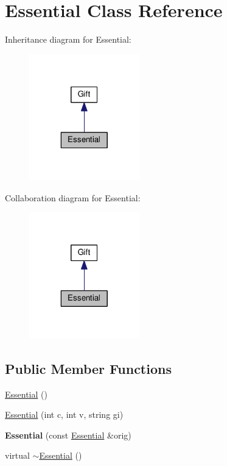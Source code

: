 \hypertarget{class_essential}{\section{Essential Class Reference}
\label{class_essential}
}


Inheritance diagram for Essential\-:
\nopagebreak
\begin{figure}[H]
\begin{center}
\leavevmode
\includegraphics[width=136pt]{class_essential__inherit__graph}
\end{center}
\end{figure}


Collaboration diagram for Essential\-:
\nopagebreak
\begin{figure}[H]
\begin{center}
\leavevmode
\includegraphics[width=136pt]{class_essential__coll__graph}
\end{center}
\end{figure}
\subsection*{Public Member Functions}
\begin{DoxyCompactItemize}
\item 
\hyperlink{class_essential_aaef0174caac5c3e828fe83880cf94a2e}{Essential} ()
\item 
\hyperlink{class_essential_a111a6573313c9f5db1f0399a677aa5d0}{Essential} (int c, int v, string gi)
\item 
\hypertarget{class_essential_aa081d0a2fee30a6aaf4e9cf22c95182a}{{\bfseries Essential} (const \hyperlink{class_essential}{Essential} \&orig)}\label{class_essential_aa081d0a2fee30a6aaf4e9cf22c95182a}

\item 
virtual \hyperlink{class_essential_a4891a496e4a5126e1591a7a22e091122}{$\sim$\-Essential} ()
\end{DoxyCompactItemize}
